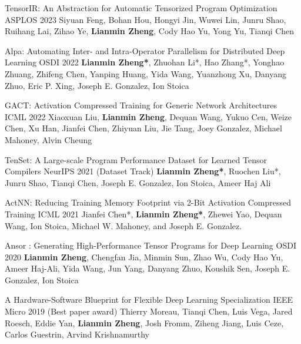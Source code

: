 
\begin{cventries}

\cventry
{}
{TensorIR: An Abstraction for Automatic Tensorized Program Optimization} %
{ASPLOS 2023} %
{} %
{Siyuan Feng, Bohan Hou, Hongyi Jin, Wuwei Lin, Junru Shao, Ruihang Lai, Zihao Ye, \textbf{Lianmin Zheng}, Cody Hao Yu, Yong Yu, Tianqi Chen}

\cventry
{}
{Alpa: Automating Inter- and Intra-Operator Parallelism for Distributed Deep Learning} %
{OSDI 2022} %
{} %
{\textbf{Lianmin Zheng*}, Zhuohan Li*, Hao Zhang*, Yonghao Zhuang, Zhifeng Chen, Yanping Huang, Yida Wang, Yuanzhong Xu, Danyang Zhuo, Eric P. Xing, Joseph E. Gonzalez, Ion Stoica}

\cventry
{}
{GACT: Activation Compressed Training for Generic Network Architectures} %
{ICML 2022} %
{} %
{Xiaoxuan Liu, \textbf{Lianmin Zheng}, Dequan Wang, Yukuo Cen, Weize Chen, Xu Han, Jianfei Chen, Zhiyuan Liu, Jie Tang, Joey Gonzalez, Michael Mahoney, Alvin Cheung}

\cventry
{}
{TenSet: A Large-scale Program Performance Dataset for Learned Tensor Compilers} %
{NeurIPS 2021 (Dataset Track)} %
{} %
{\textbf{Lianmin Zheng*}, Ruochen Liu*, Junru Shao, Tianqi Chen, Joseph E. Gonzalez, Ion Stoica, Ameer Haj Ali}

\cventry
{}
{ActNN: Reducing Training Memory Footprint via 2-Bit Activation Compressed Training} %
{ICML 2021} %
{} %
{Jianfei Chen*, \textbf{Lianmin Zheng*}, Zhewei Yao, Dequan Wang, Ion Stoica, Michael W. Mahoney, and Joseph E. Gonzalez.}

\cventry
{}
{Ansor : Generating High-Performance Tensor Programs for Deep Learning} %
{OSDI 2020} %
{} %
{\textbf{Lianmin Zheng}, Chengfan Jia, Minmin Sun, Zhao Wu, Cody Hao Yu, Ameer Haj-Ali, Yida Wang, Jun Yang, Danyang Zhuo, Koushik Sen, Joseph E. Gonzalez, Ion Stoica}

\cventry
{}
{A Hardware-Software Blueprint for Flexible Deep Learning Specialization} %
{IEEE Micro 2019 (Best paper award)} %
{} %
{Thierry Moreau, Tianqi Chen, Luis Vega, Jared Roesch, Eddie Yan, \textbf{Lianmin Zheng}, Josh Fromm, Ziheng Jiang, Luis Ceze, Carlos Guestrin, Arvind Krishnamurthy}


\end{cventries}
